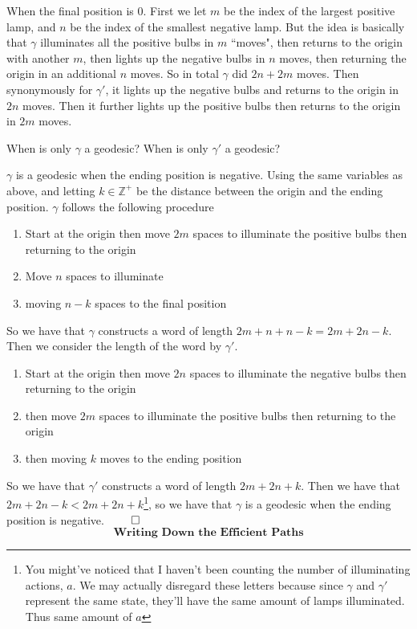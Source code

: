 When the final position is 0. First we let $m$ be the index of the largest positive lamp, and $n$ be the index of the smallest negative lamp. But the idea is basically that $\gamma$ illuminates all the positive bulbs in $m$ ``moves", then returns to the origin with another $m$, then lights up the negative bulbs in $n$ moves, then returning the origin in an additional $n$ moves. So in total $\gamma$ did $2n+2m$ moves. Then synonymously for $\gamma'$, it lights up the negative bulbs and returns to the origin in $2n$ moves. Then it further lights up the positive bulbs then returns to the origin in $2m$ moves.
\newpage
\begin{exercise}
    When is only $\gamma$ a geodesic? When is only $\gamma'$ a geodesic?
\end{exercise}
\noindent$\gamma$ is a geodesic when the ending position is negative. Using the same variables as above, and letting $k\in\mathbb{Z}^+$ be the distance between the origin and the ending position. $\gamma$ follows the following procedure
\begin{enumerate}
    \item Start at the origin then move $2m$ spaces to illuminate the positive bulbs then returning to the origin
    \item Move $n$ spaces to illuminate
    \item moving $n-k$ spaces to the final position 
\end{enumerate}
So we have that $\gamma$ constructs a word of length $2m+n+n-k=2m+2n-k$. Then we consider the length of the word by $\gamma'$.
\begin{enumerate}
    \item Start at the origin then move $2n$ spaces to illuminate the negative bulbs then returning to the origin
    \item then move $2m$ spaces to illuminate the positive bulbs then returning to the origin
    \item then moving $k$ moves to the ending position
\end{enumerate} 
So we have that $\gamma'$ constructs a word of length $2m+2n+k$. Then we have that $2m+2n-k<2m+2n+k$\footnote{You might've noticed that I haven't been counting the number of illuminating actions, $a$. We may actually disregard these letters because since $\gamma$ and $\gamma'$ represent the same state, they'll have the same amount of lamps illuminated. Thus same amount of $a$}, so we have that $\gamma$ is a geodesic when the ending position is negative. $\qed$
\[\textbf{Writing Down the Efficient Paths}\]
